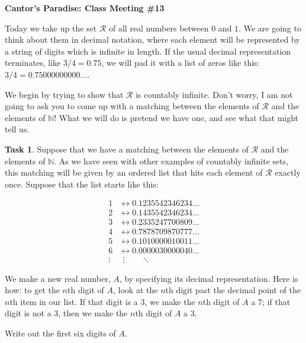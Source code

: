 \documentclass[12pt]{amsart}
\theoremstyle{definition}
\newtheorem{task}{Task}
\begin{document}
\begin{center}
\textbf{\Huge
Cantor's Paradise: Class Meeting \#13
}
\end{center}


\vspace{.5in}

Today we take up  the set $\mathcal{R}$ of all real numbers between $0$ and $1$.
We are going to think about them in decimal notation, where each element will be represented by a string of digits which is infinite in length. 
If the usual decimal representation terminates, like $3/4 = 0.75$, we will pad it with a list of zeros like this: $3/4 = 0.75000000000\dots$.

We begin by trying to show that $\mathcal{R}$ is countably infinite.
Don't worry, I am not going to ask you to come up with a matching between the elements of $\mathcal{R}$ and the elements of $\mathbb{N}$! 
What we will do is pretend we have one, and see what that might tell us.

\begin{task} 
Suppose that we have a matching between the elements of $\mathcal{R}$ and the elements of $\mathbb{N}$. 
As we have seen with other examples of countably infinite sets, this matching will be given by an ordered list that hits each element of $\mathcal{R}$ exactly once. 
Suppose that the list starts like this:

\begin{align*}
1 & \leftrightarrow  0.1235542346234 \dots \\
2 & \leftrightarrow  0.1435542346234 \dots \\
3 & \leftrightarrow  0.2335247700809 \dots \\
4 & \leftrightarrow  0.7878709870777 \dots \\
5 & \leftrightarrow  0.1010000010011 \dots \\
6 & \leftrightarrow  0.0000030000040 \dots \\
\vdots & \ \ \vdots  \qquad \ddots
\end{align*}

We make a new real number, $A$, by specifying its decimal representation. 
Here is how: to get the $n$th digit of $A$, look at the $n$th digit past the decimal point of the $n$th item in our list. 
If that digit is a $3$, we make the $n$th digit of $A$ a $7$; if that digit is not a $3$, then we make the $n$th digit of $A$ a $3$.

Write out the first six digits of $A$.

\end{task}
\end{document}
